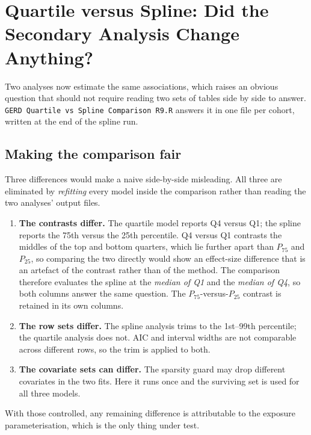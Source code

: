 \documentclass[11pt]{article}
\newcommand{\code}[1]{\texttt{\small #1}}
\begin{document}
\section{Quartile versus Spline: Did the Secondary Analysis Change Anything?}
Two analyses now estimate the same associations, which raises an obvious
question that should not require reading two sets of tables side by side to
answer. \code{GERD Quartile vs Spline Comparison R9.R} answers it in one file
per cohort, written at the end of the spline run.

\subsection{Making the comparison fair} Three differences would make a naive
side-by-side misleading. All three are eliminated by \emph{refitting} every
model inside the comparison rather than reading the two analyses' output files.

\begin{enumerate}
\item \textbf{The contrasts differ.} The quartile model reports Q4 versus Q1;
the spline reports the 75th versus the 25th percentile. Q4 versus Q1 contrasts
the middles of the top and bottom quarters, which lie further apart than
$P_{75}$ and $P_{25}$, so comparing the two directly would show an effect-size
difference that is an artefact of the contrast rather than of the method. The
comparison therefore evaluates the spline at the \emph{median of Q1} and the
\emph{median of Q4}, so both columns answer the same question. The
$P_{75}$-versus-$P_{25}$ contrast is retained in its own columns.
\item \textbf{The row sets differ.} The spline analysis trims to the
1st--99th percentile; the quartile analysis does not. AIC and interval widths
are not comparable across different rows, so the trim is applied to both.
\item \textbf{The covariate sets can differ.} The sparsity guard may drop
different covariates in the two fits. Here it runs once and the surviving set is
used for all three models.
\end{enumerate}

\noindent With those controlled, any remaining difference is attributable to the
exposure parameterisation, which is the only thing under test.
\end{document}
